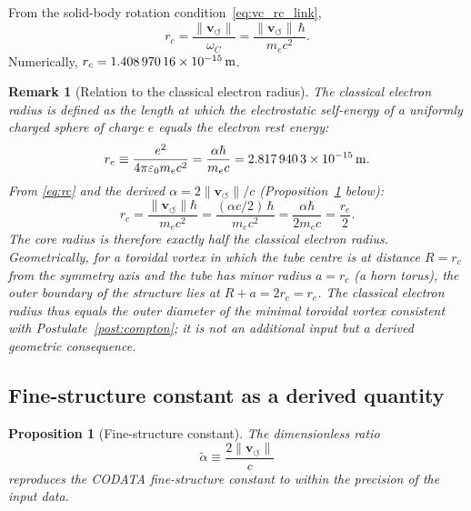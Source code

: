 \documentclass[aps,pra,preprint,longbibliography,nofootinbib]{revtex4-2}
\newtheorem{proposition}{Proposition}
\newtheorem{remark}{Remark}
\newcommand{\vnorm}{\lVert\mathbf{v}_{\!\boldsymbol{\circlearrowleft}}\rVert} %
\newcommand{\rc}{r_c}                            %
\newcommand{\omC}{\omega_C}                      %
\begin{document}
From the solid-body rotation condition~\eqref{eq:vc_rc_link},
\begin{equation}
  \rc = \frac{\vnorm}{\omC} = \frac{\vnorm\,\hbar}{m_e c^2}.
  \label{eq:rc}
\end{equation}
Numerically, $\rc = \SI{1.408\,970\,16e-15}{\meter}$.

\begin{remark}[Relation to the classical electron radius]
\label{rem:re}
The classical electron radius is defined as the length at which the
electrostatic self-energy of a uniformly charged sphere of charge $e$
equals the electron rest energy:
\begin{equation}
  r_e \equiv \frac{e^2}{4\pi\varepsilon_0 m_e c^2}
            = \frac{\alpha\hbar}{m_e c}
            = \SI{2.817\,940\,3e-15}{\meter}.
  \label{eq:re}
\end{equation}
From \eqref{eq:rc} and the derived $\alpha = 2\vnorm/c$
(Proposition~\ref{prop:alpha} below):
\begin{equation}
  \rc = \frac{\vnorm\hbar}{m_e c^2}
      = \frac{(\alpha c/2)\,\hbar}{m_e c^2}
      = \frac{\alpha\hbar}{2 m_e c}
      = \frac{r_e}{2}.
  \label{eq:rc_re}
\end{equation}
The core radius is therefore exactly half the classical electron radius.
Geometrically, for a toroidal vortex in which the tube centre
is at distance $R = \rc$ from the symmetry axis and the tube has
minor radius $a = \rc$ (a horn torus), the outer boundary of the
structure lies at $R + a = 2\rc = r_e$.
The classical electron radius thus equals the outer diameter of the
minimal toroidal vortex consistent with
Postulate~\ref{post:compton}; it is not an additional input but
a derived geometric consequence.
\end{remark}

\subsection{Fine-structure constant as a derived quantity}
\label{sec:alpha}

\begin{proposition}[Fine-structure constant]
\label{prop:alpha}
The dimensionless ratio
\begin{equation}
  \tilde\alpha \equiv \frac{2\vnorm}{c}
  \label{eq:alpha_derived}
\end{equation}
reproduces the CODATA fine-structure constant to within the precision
of the input data.
\end{proposition}
\end{document}
